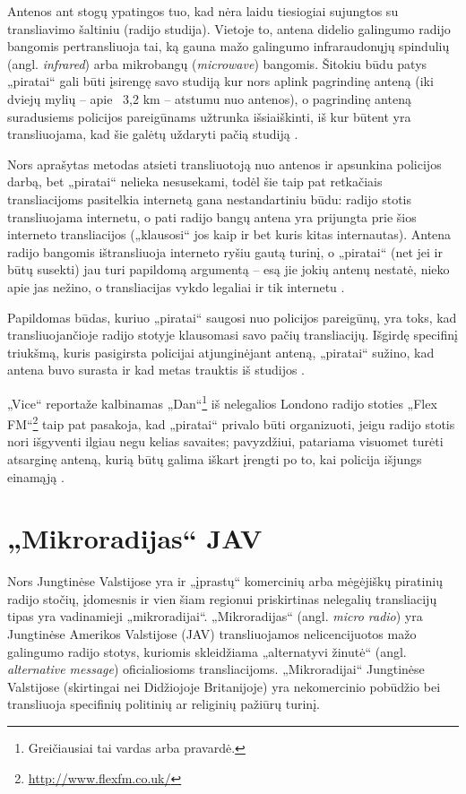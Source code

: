 \documentclass[kursinis-darbas]{vukf}
\begin{document}
Antenos ant stogų ypatingos tuo, kad nėra laidu tiesiogiai sujungtos su transliavimo šaltiniu (radijo studija). Vietoje to, antena didelio galingumo radijo bangomis pertransliuoja tai, ką gauna mažo galingumo infraraudonųjų spindulių (angl. \emph{infrared}) arba mikrobangų (\emph{microwave}) bangomis. Šitokiu būdu patys „piratai“ gali būti įsirengę savo studiją kur nors aplink pagrindinę anteną (iki dviejų mylių – apie ~3,2 km – atstumu nuo antenos), o pagrindinę anteną suradusiems policijos pareigūnams užtrunka išsiaiškinti, iš kur būtent yra transliuojama, kad šie galėtų uždaryti pačią studiją \cite{vice_london_pirate_sequences}.

Nors aprašytas metodas atsieti transliuotoją nuo antenos ir apsunkina policijos darbą, bet „piratai“ nelieka nesusekami, todėl šie taip pat retkačiais transliacijoms pasitelkia internetą gana nestandartiniu būdu: radijo stotis transliuojama internetu, o pati radijo bangų antena yra prijungta prie šios interneto transliacijos („klausosi“ jos kaip ir bet kuris kitas internautas). Antena radijo bangomis ištransliuoja interneto ryšiu gautą turinį, o „piratai“ (net jei ir būtų susekti) jau turi papildomą argumentą – esą jie jokių antenų nestatė, nieko apie jas nežino, o transliacijas vykdo legaliai ir tik internetu \cite{new_scientist_how_airwave_pirates_are_going_online}.

Papildomas būdas, kuriuo „piratai“ saugosi nuo policijos pareigūnų, yra toks, kad transliuojančioje radijo stotyje klausomasi savo pačių transliacijų. Išgirdę specifinį triukšmą, kuris pasigirsta policijai atjunginėjant anteną, „piratai“ sužino, kad antena buvo surasta ir kad metas trauktis iš studijos \cite{vice_london_pirate_sequences}.

„Vice“ reportaže kalbinamas „Dan“\footnote{Greičiausiai tai vardas arba pravardė.} iš nelegalios Londono radijo stoties „Flex FM“\footnote{\url{http://www.flexfm.co.uk/}} taip pat pasakoja, kad „piratai“ privalo būti organizuoti, jeigu radijo stotis nori išgyventi ilgiau negu kelias savaites; pavyzdžiui, patariama visuomet turėti atsarginę anteną, kurią būtų galima iškart įrengti po to, kai policija išjungs einamąją \cite{vice_london_pirate_sequences}.


\section{„Mikroradijas“ JAV}

Nors Jungtinėse Valstijose yra ir „įprastų“ komercinių arba mėgėjiškų piratinių radijo stočių, įdomesnis ir vien šiam regionui priskirtinas nelegalių transliacijų tipas yra vadinamieji „mikroradijai“. „Mikroradijas“ (angl. \emph{micro radio}) yra Jungtinėse Amerikos Valstijose (JAV) transliuojamos nelicencijuotos mažo galingumo radijo stotys, kuriomis skleidžiama „alternatyvi žinutė“ (angl. \emph{alternative message}) \cite[p.~134]{hc_key_concepts_in_radio_studies} oficialiosioms transliacijoms. „Mikroradijai“ Jungtinėse Valstijose (skirtingai nei Didžiojoje Britanijoje) yra nekomercinio pobūdžio bei transliuoja specifinių politinių ar religinių pažiūrų turinį.
\end{document}
